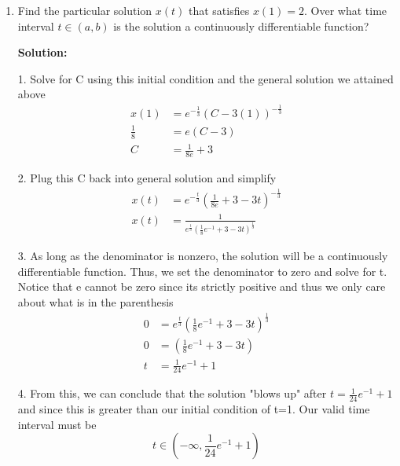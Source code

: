 \documentclass[12pt]{article}
\begin{document}
\begin{enumerate}
          7. Isolate u
          \begin{align*}
              u & = -3e^tt + e^tC
          \end{align*}

          8. Substitute x back in for u
          \begin{align*}
              x(t)^{-3} & = e^t(-3t + C)                          \\
              x(t)      & = e^{-\frac{t}{3}}(C-3t)^{-\frac{1}{3}}
          \end{align*}

    \item[(b)] Find the particular solution $x(t)$ that satisfies $x(1) = 2$. Over what time interval $t \in (a, b)$ is the solution a continuously differentiable function?

          \textbf{Solution:}

          1. Solve for C using this initial condition and the general solution we attained above
          \begin{align*}
              x(1)        & = e^{-\frac{1}{3}}(C-3(1))^{-\frac{1}{3}} \\
              \frac{1}{8} & = e(C-3)                                  \\
              C           & = \frac{1}{8e} + 3
          \end{align*}

          2. Plug this C back into general solution and simplify
          \begin{align*}
              x(t) & = e^{-\frac{t}{3}}(\frac{1}{8e} + 3-3t)^{-\frac{1}{3}}              \\
              x(t) & = \frac{1}{e^{\frac{t}{3}}(\frac{1}{8}e^{-1} + 3-3t)^{\frac{1}{3}}}
          \end{align*}

          3. As long as the denominator is nonzero, the solution will be a continuously differentiable function. Thus, we set the denominator to zero and solve for t. Notice that e cannot be zero since its strictly positive and thus we only care about what is in the parenthesis
          \begin{align*}
              0 & = e^{\frac{t}{3}}(\frac{1}{8}e^{-1} + 3-3t)^{\frac{1}{3}} \\
              0 & = (\frac{1}{8}e^{-1} + 3-3t)                              \\
              t & = \frac{1}{24}e^{-1} + 1
          \end{align*}

          4. From this, we can conclude that the solution "blows up" after $t = \frac{1}{24}e^{-1} + 1$ and since this is greater than our initial condition of t=1. Our valid time interval must be
          \[
              t \in{(-\infty{},  \frac{1}{24}e^{-1} + 1)}
          \]
\end{enumerate}
\end{document}
